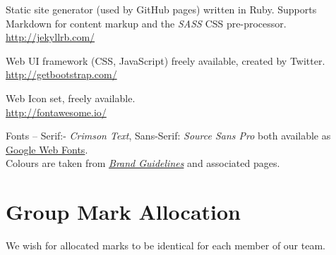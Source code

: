 \documentclass[a4paper, notoc]{tufte-handout}
\let\origdescription\description
\renewenvironment{description}{
  \setlength{\leftmargini}{1.5em}
  \origdescription
  \setlength{\itemindent}{-1.5em}
  \setlength{\labelsep}{\textwidth}
}
{\endlist}
\begin{document}
\begin{description}

\item[Jekyll]
Static site generator (used by GitHub pages) written in Ruby. Supports Markdown for 
content markup and the \textit{SASS} CSS pre-processor.
\\
\href{http://jekyllrb.com/}{http://jekyllrb.com/}

\item[BootStrap]
Web UI framework (CSS, JavaScript) freely available, created by Twitter.
\\
\href{http://getbootstrap.com/}{http://getbootstrap.com/}

\item[FontAwesome]
Web Icon set, freely available.
\\
\href{http://fontawesome.io/}{http://fontawesome.io/}


\item[University of Edinburgh Style Guide]
Fonts -- Serif:- \textit{Crimson Text}, Sans-Serif: \textit{Source Sans Pro} both 
available as \href{https://fonts.google.com/}{Google Web Fonts}.
\\
Colours are taken from 
\href{http://www.ed.ac.uk/communications-marketing/resources}{\textit{Brand Guidelines}} 
and associated pages.
\\



\end{description}




\section*{Group Mark Allocation}\label{group-mark-allocation}


We wish for allocated marks to be identical for each member of our team.
\end{document}
